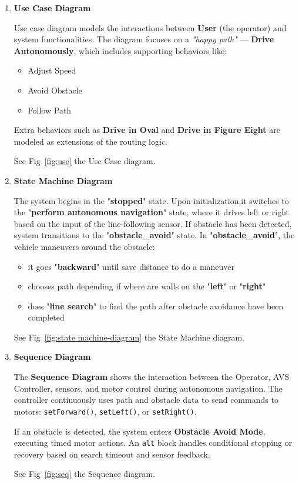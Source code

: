 \documentclass[conference]{IEEEtran}
\begin{document}
\begin{enumerate}
\item\textbf{Use Case Diagram}

Use case diagram models the interactions between \textbf{User} (the operator) and system functionalities. 
The diagram focuses on a \textit{"happy path"} — \textbf{Drive Autonomously}, which includes supporting behaviors like:

\begin{itemize}[nosep, left=0pt]
    \item Adjust Speed
    \item Avoid Obstacle
    \item Follow Path
\end{itemize}
\vspace{0.8em}
Extra behaviors such as \textbf{Drive in Oval} and \textbf{Drive in Figure Eight} are modeled as extensions of the routing logic.

\hspace*{1em}See  Fig~\ref{fig:use} the Use Case diagram.
\vspace{1em}
\item \textbf{State Machine Diagram}

The system begins in the "\textbf{stopped}" state. Upon initialization,it switches to the "\textbf{perform autonomous navigation}" state, where it drives left or right based on the input of the line-following sensor. If obstacle has been detected, system transitions to the "\textbf{obstacle\_avoid}" state. 
\hspace*{1em}In "\textbf{obstacle\_avoid}", the vehicle maneuvers around the obstacle:
\begin{itemize}
    \item it goes "\textbf{backward}" until save distance to do a maneuver
    \item chooses path depending if where are walls on the "\textbf{left}" or "\textbf{right}"
    \item  does "\textbf{line search}" to find the path after obstacle avoidance have been completed
\end{itemize}
\hspace*{1em}See  Fig~\ref{fig:state machine-diagram} the State Machine diagram.
\vspace{1em}
\item \textbf{Sequence Diagram}

\hspace*{1em}The \textbf{Sequence Diagram} shows the interaction between the Operator, AVS Controller, sensors, and motor control during autonomous navigation. The controller continuously uses path and obstacle data to send commands to motors: \texttt{setForward()}, \texttt{setLeft()}, or \texttt{setRight()}.

\hspace*{1em}If an obstacle is detected, the system enters \textbf{Obstacle Avoid Mode}, executing timed motor actions. An \texttt{alt} block handles conditional stopping or recovery based on search timeout and sensor feedback.

\hspace*{1em}See  Fig~\ref{fig:seq} the Sequence diagram.
\end{enumerate}
\vspace{1em}
\end{document}
